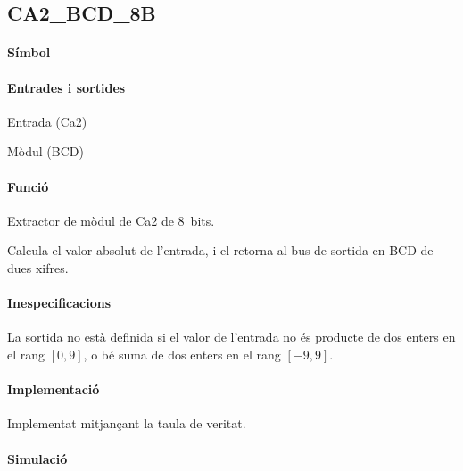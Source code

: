 \subsection{\label{sub:\projectname-CA2_BCD_8B} \textsf{CA2\_BCD\_8B}}

\paragraph{Símbol}

\begin{center}  \end{center}

\paragraph{Entrades i sortides}

\begin{where}
\item[\nodenamerange{CA2}{7}{0}] Entrada (Ca2)
\item[\nodenamerange{BCD}{7}{0}] Mòdul (BCD)
\end{where}

\paragraph{Funció}

Extractor de mòdul de Ca2 de 8~bits.

Calcula el valor absolut de l'entrada, i el retorna al bus de sortida en BCD de dues xifres.

\paragraph{Inespecificacions}


La sortida no està definida si el valor de l'entrada no és producte de dos
enters en el rang $\left[0, 9\right]$, o bé suma de dos enters en el rang
$\left[-9, 9\right]$.


\paragraph{Implementació}




Implementat mitjançant la taula de veritat.

\paragraph{Simulació}

